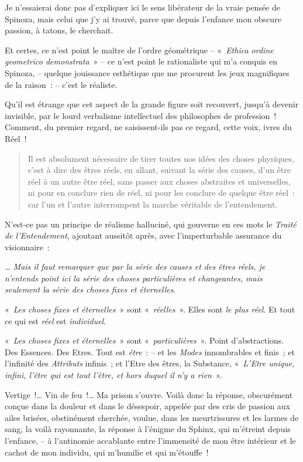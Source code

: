 Je n'essaierai donc pas d'expliquer ici le sens libérateur de la vraie
pensée de Spinoza, mais celui que j'y ai trouvé, parce que depuis
l'enfance mon obscure passion, à tatons, le cherchait.

Et certes, ce n'est point le maître de l'ordre géométrique --
«~\emph{Ethica ordine geometrico demonstrata}~» -- ce n'est point le
rationaliste qui m'a conquis en Spinoza, -- quelque jouissance
esthétique que me procurent les jeux magnifiques de la raison~: -- c'est
le réaliste.

Qu'il est étrange que cet aspect de la grande figure soit
recouvert, jusqu'à devenir invisible, par le lourd verbalisme
intellectuel des philosophes de profession~! Comment, du premier regard,
ne saisissent-ils pas ce regard, cette voix, ivres du Réel~!

\begin{quote}
Il est absolument nécessaire de tirer toutes nos idées des choses
physiques, c'est à dire des êtres réels, en allant, suivant la série des
causes, d'un être réel à un autre être réel, sans passer aux choses
abstraites et universelles, ni pour en conclure rien de réel, ni pour
les conclure de quelque être réel~: car l'un et l'autre interrompent la
marche véritable de l'entendement.
\end{quote}

N'est-ce pas un principe de réalisme halluciné, qui gouverne en ces mots
le \emph{Traité de l'Entendement}, ajoutant aussitôt
après, avec l'imperturbable assurance du visionnaire~:

\emph{\ldots{} Mais il faut remarquer que par la série des causes et des
êtres réels, je n'entends point ici la série des choses particulières et
changeantes, mais seulement la série des choses fixes et
éternelles}.

«~\emph{Les choses fixes et éternelles}~» sont «~\emph{réelles}~». Elles
sont \emph{le plus réel}. Et tout ce qui est \emph{réel} est
\emph{individuel}.

«~\emph{Les choses fixes et éternelles}~» sont
«~\emph{particulières}~». Point d'abstractions. Des
Essences. Des Etres. Tout est \emph{être~}: -- et les \emph{Modes}
innombrables et finis~; et l'infinité des \emph{Attributs} infinis~; et
l'Etre des êtres, la Substance, «~\emph{L'Etre unique, infini, l'être
qui est tout l'être, et hors duquel il n'y a rien}~».

Vertige~!\ldots{} Vin de feu~!\ldots{} Ma prison s'ouvre. Voilà donc la réponse,
obscurément conçue dans la douleur et dans le désespoir, appelée par des
cris de passion aux ailes brisées, obstinément cherchée, voulue, dans
les meurtrissures et les larmes de sang, la voilà rayonnante, la réponse
à l'énigme du Sphinx, qui m'étreint depuis l'enfance, -- à l'antinomie
accablante entre l'immensité de mon être intérieur et le cachot de mon
individu, qui m'humilie et qui m'étouffe~!

